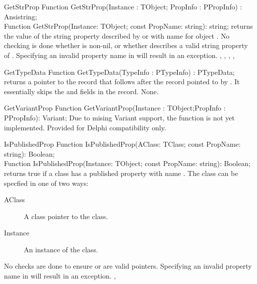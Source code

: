 
\begin{function}{GetStrProp}
\Declaration
Function GetStrProp(Instance : TObject;
                    PropInfo : PPropInfo) : Ansistring;\\
Function GetStrProp(Instance: TObject; 
                    const PropName: string): string;
\Description
{} returns the value of the string property described by
 or with name  for object . 
\Errors
No checking is done whether  is non-nil, or whether
 describes a valid string property of .
Specifying an invalid property name in  will result in an
 exception.
\SeeAlso
{}, , ,
,
\end{function}


\begin{function}{GetTypeData}
\Declaration
Function GetTypeData(TypeInfo : PTypeInfo) : PTypeData;
\Description
{} returns a pointer to the  record that
follows after the  record pointed to by .
It essentially skips the  and  fields in the 
 record.
\Errors
None.
\SeeAlso
\end{function}

\begin{function}{GetVariantProp}
\Declaration
Function GetVariantProp(Instance : TObject;PropInfo : PPropInfo): Variant;
\Description
Due to mising Variant support, the  function is not 
yet implemented. Provided for Delphi compatibility only.
\Errors
\SeeAlso
{}
\end{function}

\begin{function}{IsPublishedProp}
\Declaration
Function IsPublishedProp(AClass: TClass; const PropName: string): Boolean;\\
Function IsPublishedProp(Instance: TObject; const PropName: string): Boolean;                              
\Description
{} returns true if a class has a published property with
name . The class can be specfied in one of two ways:
\begin{description}
\item[AClass] A class pointer to the class.
\item[Instance] An instance of the class.
\end{description}
\Errors
No checks are done to ensure  or  are valid
pointers. Specifying an invalid property name in  will result
in an  exception.                                                 
\SeeAlso
{}, 
\end{function}

